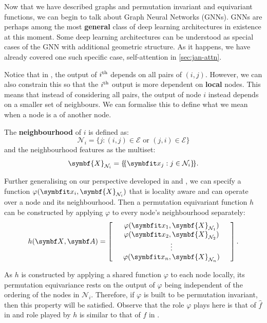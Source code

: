 Now that we have described graphs and permutation invariant and equivariant functions, we can begin to talk about Graph Neural Networks (GNNs). GNNs are perhaps among the most \textbf{general} class of deep learning architectures in existence at this moment. Some deep learning architectures can be understood as special cases of the GNN with additional geometric structure. As it happens, we have already covered one such specific case, self-attention in \cref{sec:jan-attn}.

Notice that in , the output of $i\textsuperscript{th}$ depends on all pairs of $(i, j)$. However, we can also constrain this so that the $i\textsuperscript{th}$ output is more dependent on \textbf{local} nodes. This means that instead of considering all pairs, the output of node $i$ instead depends on a smaller set of neighbours. We can formalise this to define what we mean when a node is a   of another node.

The \textbf{neighbourhood} of $i$ is defined as:
\begin{equation}
\mathcal{N}_{i}=\{j:(i, j) \in \mathcal{E} \text { or }(j, i) \in \mathcal{E}\}
\end{equation}
and the neighbourhood features as the multiset:
\begin{equation}
\symbf{X}_{\mathcal{N}_{i}}=\ldblbrace\bfitx_{j}: j \in \mathcal{N}_{i}\rdblbrace .
\end{equation}

Further generalising on our perspective developed in  and , we can specify a function $\varphi(\bfitx_i, \symbf{X}_{\mathcal{N}_{i}})$ that is locality aware and can operate over a node and its neighbourhood. Then a permutation equivariant function $h$ can be constructed by applying $\varphi$ to every node's neighbourhood separately:
\begin{equation}
    h({\symbf X}, {\symbf A}) =
\left[
  \begin{array}{ccc}
     & \varphi(\bfitx_1, \symbf{X}_{\mathcal{N}_1}) &  \\
     & \varphi(\bfitx_2, \symbf{X}_{\mathcal{N}_2}) &  \\
             & \vdots    &          \\
     & \varphi(\bfitx_n, \symbf{X}_{\mathcal{N}_n}) & 
  \end{array}
\right].
\label{eq:graph_equivariant}
\end{equation}

As $h$ is constructed by applying a shared function $\varphi$ to each node locally, its permutation equivariance rests on the output of $\varphi$ being independent of the ordering of the nodes in $\mathcal{N}_i$. Therefore, if $\varphi$ is built to be permutation invariant, then this property will be satisfied. Observe that the role $\varphi$ plays here is that of $\widehat{f}$ in  and role played by $h$ is similar to that of $f$ in .

